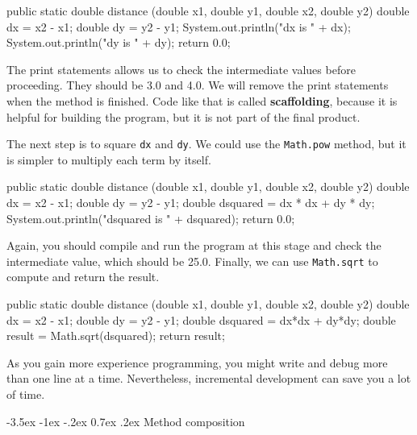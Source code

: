 \documentclass[12pt]{book}
\makeatletter
\theoremstyle{exercise}
\newcommand{\java}[1]{\verb"#1"}
\renewcommand{\section}{\@startsection{section}{1}{\z@}%
    {-3.5ex \@plus -1ex \@minus -.2ex}%
    {0.7ex \@plus.2ex}%
    {\normalfont\Large\bfseries}}
\newcommand{\java}[1]{\lstinline{#1}} %
\makeatother
\begin{document}
\begin{code}
    public static double distance
            (double x1, double y1, double x2, double y2) {
        double dx = x2 - x1;
        double dy = y2 - y1;
        System.out.println("dx is " + dx);
        System.out.println("dy is " + dy);
        return 0.0;
    }
\end{code}


The print statements allows us to check the intermediate values before proceeding.
They should be 3.0 and 4.0.
We will remove the print statements when the method is finished.
Code like that is called {\bf scaffolding}, because it is helpful for building the program, but it is not part of the final product.

The next step is to square \java{dx} and \java{dy}.
We could use the \java{Math.pow} method, but it is simpler to multiply each term by itself.

\begin{code}
    public static double distance
            (double x1, double y1, double x2, double y2) {
        double dx = x2 - x1;
        double dy = y2 - y1;
        double dsquared = dx * dx + dy * dy;
        System.out.println("dsquared is " + dsquared);
        return 0.0;
    }
\end{code}

Again, you should compile and run the program at this stage and check the intermediate value, which should be 25.0.
Finally, we can use \java{Math.sqrt} to compute and return the result.

\begin{code}
    public static double distance
            (double x1, double y1, double x2, double y2) {
        double dx = x2 - x1;
        double dy = y2 - y1;
        double dsquared = dx*dx + dy*dy;
        double result = Math.sqrt(dsquared);
        return result;
    }
\end{code}


As you gain more experience programming, you might write and debug more than one line at a time.
Nevertheless, incremental development can save you a lot of time.


\section{Method composition}
\end{document}
